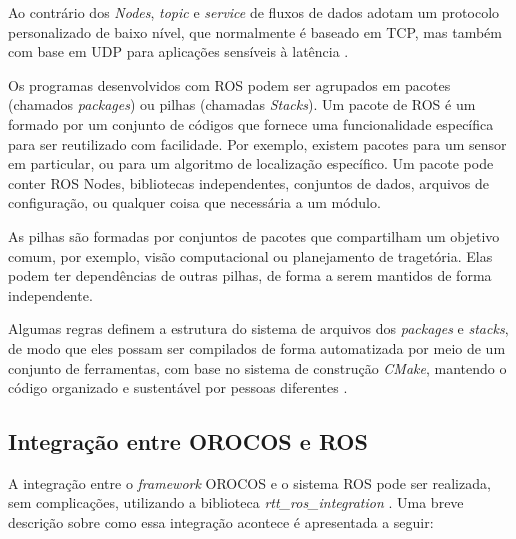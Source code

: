 \documentclass[conference]{IEEEtran}
\begin{document}
Ao contrário dos \textit{Nodes}, \textit{topic} e \textit{service} de fluxos de dados adotam um protocolo personalizado de baixo nível, que normalmente é baseado em TCP, mas também com base em UDP para aplicações sensíveis à latência \cite{OKa13_ROS_Gentle}.  

Os programas desenvolvidos com ROS podem ser agrupados em pacotes (chamados \textit{packages}) ou pilhas (chamadas \textit{Stacks}). Um pacote de ROS é um formado por um conjunto de códigos que fornece uma funcionalidade específica para ser reutilizado com facilidade. Por exemplo, existem pacotes para um sensor em particular, ou para um algoritmo de localização específico.	Um pacote pode conter ROS Nodes, bibliotecas independentes, conjuntos de dados, arquivos de configuração, ou qualquer coisa que necessária a um módulo.

As pilhas são formadas por conjuntos de pacotes que compartilham um objetivo comum, por exemplo, visão computacional ou planejamento de tragetória. Elas podem ter dependências de outras pilhas, de forma a serem mantidos de forma independente.

Algumas regras definem a estrutura do sistema de arquivos dos \textit{packages} e \textit{stacks}, de modo que eles possam ser compilados de forma automatizada por meio de um conjunto de ferramentas, com base no sistema de construção \textit{CMake}, mantendo o código organizado e sustentável por pessoas diferentes \cite{cmake_org}.

\subsection{Integração entre OROCOS e ROS}\label{subsec:rtt_ros_integration}

A integração entre o \textit{framework} OROCOS e o sistema ROS pode ser realizada, sem complicações, utilizando a biblioteca \textit{rtt\_ros\_integration} \cite{rtt_ros_integration}. Uma breve descrição sobre como essa integração acontece é apresentada a seguir:
\end{document}
